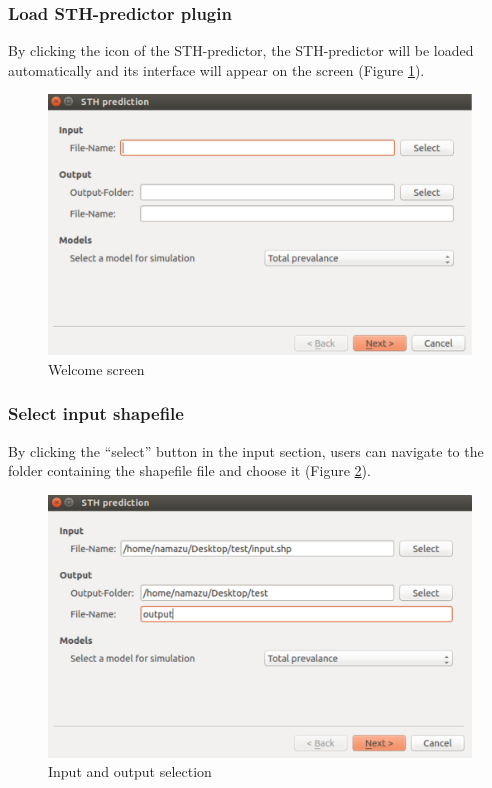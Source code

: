 \documentclass[12pt,oneside]{memoir}
\begin{document}
\subsubsection{Load STH-predictor plugin}
By clicking the icon of the STH-predictor, the STH-predictor will be loaded automatically and its interface will appear on the screen (Figure \ref{sthwelcome}).
\begin{figure}[H]
\centering
\includegraphics[scale=0.5]{sthwelcome} 
\caption{Welcome screen} 
\label{sthwelcome}
\end{figure}

\subsubsection{Select input shapefile}
By clicking the ``select'' button in the input section, users can navigate to the folder containing the shapefile file and choose it (Figure \ref{sthselection}).

\begin{figure}[H]
\centering
\includegraphics[scale=0.5]{sthselection} 
\caption{Input and output selection} 
\label{sthselection}
\end{figure}
\end{document}
